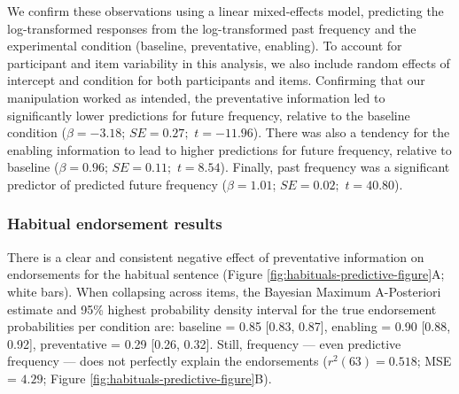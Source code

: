 \documentclass[english,,man,floatsintext]{apa6}
\theoremstyle{definition}
\theoremstyle{definition}
\theoremstyle{definition}
\theoremstyle{remark}
\begin{document}
We confirm these observations using a linear mixed-effects model,
predicting the log-transformed responses from the log-transformed past
frequency and the experimental condition (baseline, preventative,
enabling). To account for participant and item variability in this
analysis, we also include random effects of intercept and condition for
both participants and items. Confirming that our manipulation worked as
intended, the preventative information led to significantly lower
predictions for future frequency, relative to the baseline condition
(\(\beta = -3.18\); \(SE = 0.27;\) \(t = -11.96\)). There was also a
tendency for the enabling information to lead to higher predictions for
future frequency, relative to baseline (\(\beta = 0.96\); \(SE = 0.11;\)
\(t = 8.54\)). Finally, past frequency was a significant predictor of
predicted future frequency (\(\beta = 1.01\); \(SE = 0.02;\)
\(t = 40.80\)).

\hypertarget{habitual-endorsement-results}{%
\subsubsection{Habitual endorsement
results}\label{habitual-endorsement-results}}

There is a clear and consistent negative effect of preventative
information on endorsements for the habitual sentence (Figure
\ref{fig:habituals-predictive-figure}A; white bars). When collapsing
across items, the Bayesian Maximum A-Posteriori estimate and 95\%
highest probability density interval for the true endorsement
probabilities per condition are: baseline = 0.85 {[}0.83, 0.87{]},
enabling = 0.90 {[}0.88, 0.92{]}, preventative = 0.29 {[}0.26, 0.32{]}.
Still, frequency --- even predictive frequency --- does not perfectly
explain the endorsements (\(r^2(63) = 0.518\); MSE = \(4.29\); Figure
\ref{fig:habituals-predictive-figure}B).
\end{document}
